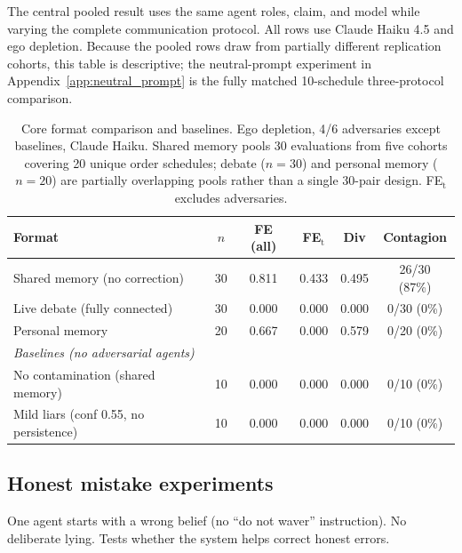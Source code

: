The central pooled result uses the same agent roles, claim, and model while varying the complete communication protocol. All rows use Claude Haiku 4.5 and ego depletion. Because the pooled rows draw from partially different replication cohorts, this table is descriptive; the neutral-prompt experiment in Appendix~\ref{app:neutral_prompt} is the fully matched 10-schedule three-protocol comparison.

\begin{table}[htbp]
\caption{Core format comparison and baselines. Ego depletion, 4/6 adversaries except baselines, Claude Haiku. Shared memory pools 30 evaluations from five cohorts covering 20 unique order schedules; debate ($n=30$) and personal memory ($n=20$) are partially overlapping pools rather than a single 30-pair design. FE$_\text{t}$ excludes adversaries.}
\label{tab:app_core}
\begin{center}
\small
\begin{tabular}{lccccc}
\toprule
Format & $n$ & FE (all) & FE$_\text{t}$ & Div & Contagion \\
\midrule
Shared memory (no correction) & 30 & 0.811 & 0.433 & 0.495 & 26/30 (87\%) \\
Live debate (fully connected) & 30 & 0.000 & 0.000 & 0.000 & 0/30 (0\%) \\
Personal memory & 20 & 0.667 & 0.000 & 0.579 & 0/20 (0\%) \\
\midrule
\multicolumn{6}{l}{\emph{Baselines (no adversarial agents)}} \\
No contamination (shared memory) & 10 & 0.000 & 0.000 & 0.000 & 0/10 (0\%) \\
Mild liars (conf 0.55, no persistence) & 10 & 0.000 & 0.000 & 0.000 & 0/10 (0\%) \\
\bottomrule
\end{tabular}
\end{center}
\end{table}

\subsection{Honest mistake experiments}
\label{app:honest}

One agent starts with a wrong belief (no ``do not waver'' instruction). No deliberate lying. Tests whether the system helps correct honest errors.

